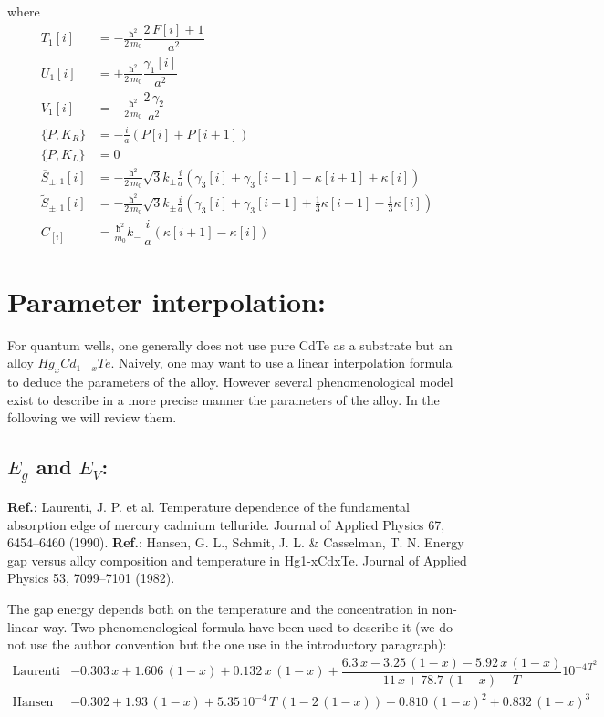 \documentclass[prb,aps]{revtex4}
\begin{document}
    where
	\begin{align}
	    T_1[i] &= - \frac{ħ^2}{2\,m_0} \dfrac{2\,F[i] + 1}{a^2} \\
		U_1[i] &= + \frac{ħ^2 }{2\,m_0} \dfrac{γ_1[i]}{a^2}\\
		V_1[i] &= - \frac{ħ^2 }{2\,m_0} \dfrac{2\,γ_2}{a^2}\\
		\{P,K_R\} &= - \frac{i}{a}\left(P[i]+P[i+1]\right)\\
		\{P,K_L\} &= 0\\
		\overline{S}_{\pm,1}[i]
		&=- \frac{ħ^2}{2\,m_0} \sqrt{3}  k_\pm \frac{i}{a} \left(γ_3[i] + γ_3[i+1]-κ[i+1]+κ[i]\right)\\
		\tilde{S}_{\pm,1}[i]
		&= - \frac{ħ^2}{2\,m_0} \sqrt{3}  k_\pm \frac{i}{a} \left(γ_3[i] + γ_3[i+1] + \frac13 κ[i+1] - \frac13 κ[i]\right)\\
		C_[i] &= \frac{ħ^2}{m_0} k_-\,\dfrac{i}{a}\left(κ[i+1]-κ[i]\right)		
	\end{align}




\section{Parameter interpolation:}

    For quantum wells, one generally does not use pure CdTe as a substrate but an alloy $Hg_xCd_{1-x}Te$. Naively, one may want to use a linear interpolation formula to deduce the parameters of the alloy. However several phenomenological model exist to describe in a more precise manner the parameters of the alloy. In the following we will review them.

    \subsection{$E_g$ and $E_V$:}

        {\bf Ref.}:  Laurenti, J. P. et al. Temperature dependence of the fundamental absorption edge of mercury cadmium telluride. Journal of Applied Physics 67, 6454–6460 (1990).
        {\bf Ref.}:  Hansen, G. L., Schmit, J. L. \& Casselman, T. N. Energy gap versus alloy composition and temperature in Hg1-xCdxTe. Journal of Applied Physics 53, 7099–7101 (1982).


        The gap energy depends both on the temperature and the concentration in non-linear way. Two phenomenological formula have been used to describe it (we do not use the author convention but the one use in the introductory paragraph):
        \begin{align}
            \text{Laurenti}& -0.303\,x + 1.606\,(1-x) + 0.132\,x\,(1-x) + \dfrac{6.3\,x - 3.25\,(1-x) - 5.92\,x\,(1-x)}{11\,x + 78.7\,(1-x) + T}10^{-4\,T^2}\\
            \text{Hansen}& -0.302 + 1.93\,(1-x) + 5.35\,10^{-4}\,T\,(1-2\,(1-x)) -0.810\,(1-x)^2 + 0.832\,(1-x)^3
        \end{align}
\end{document}
